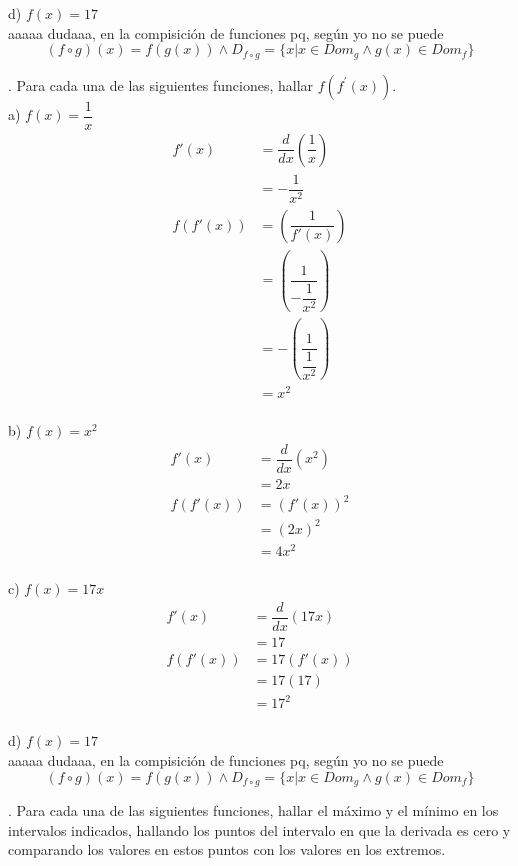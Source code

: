 \documentclass[letterpaper]{article}
\newcommand{\fp}[1]{#1^{\prime}}
\newcommand{\de}{\dfrac{d}{dx}}
\begin{document}
d) $ f(x) = 17 $\\

aaaaa dudaaa, en la compisición de funciones pq, según yo no se puede
\[
(f \circ g) (x) = f(g(x)) \land D_{f\circ g} = \{ x | x \in Dom_g \land g(x) \in Dom_f \}
\]

. Para cada una de las siguientes funciones, hallar $ f(\fp{f} (x)) $.\\

a) $ f(x) = \dfrac{1}{x} $\\

\begin{align*}
	f'(x) &= \de \left( \dfrac{1}{x} \right)\\
	&= - \dfrac{1}{x^2}\\
	f(f'(x)) &= \left( \dfrac{1}{f'(x)} \right)\\
	&= \left( \dfrac{1}{- \dfrac{1}{x^2}} \right)\\
	&= -\left( \dfrac{1}{\dfrac{1}{x^2}} \right)\\
	&= x^{2}\\
\end{align*}

b) $ f(x) = x^{2} $\\

\begin{align*}
	f'(x)&= \de \left( x^{2} \right)\\
	&= 2x\\
	f(f'(x))&= (f'(x))^2\\
	&= (2x)^{2}\\
	&= 4x^{2}\\
\end{align*}

c) $ f(x) = 17x $\\

\begin{align*}
	f'(x)&= \de \left( 17x \right) \\
	&= 17\\
	f(f'(x)) &= 17(f'(x))\\
	&= 17(17)\\
	&= 17^{2}\\
\end{align*}

d) $ f(x) = 17 $\\

aaaaa dudaaa, en la compisición de funciones pq, según yo no se puede
\[
(f \circ g) (x) = f(g(x)) \land D_{f\circ g} = \{ x | x \in Dom_g \land g(x) \in Dom_f \}
\]

. Para cada una de las siguientes funciones, hallar el máximo y el mínimo en los intervalos indicados, hallando los puntos del intervalo en que la derivada es cero y comparando los valores en estos puntos con los valores en los extremos.\\
\end{document}
